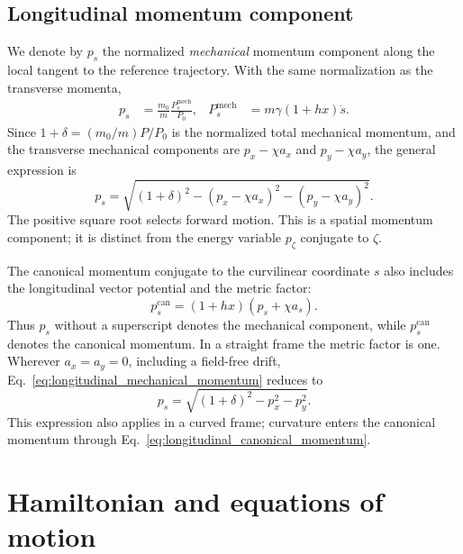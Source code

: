 \subsection{Longitudinal momentum component}
\label{sec:longitudinal_momentum}

We denote by $p_s$ the normalized \emph{mechanical} momentum component
along the local tangent to the reference trajectory. With the same
normalization as the transverse momenta,
\begin{align}
 p_s &= \frac{m_0}{m}\frac{P_s^{\mathrm{mech}}}{P_0}, &
 P_s^{\mathrm{mech}} &= m\gamma(1+hx)\dot s.
\end{align}
Since $1+\delta=(m_0/m)P/P_0$ is the normalized total mechanical
momentum, and the transverse mechanical components are $p_x-\chi a_x$
and $p_y-\chi a_y$, the general expression is
\begin{equation}
 p_s = \sqrt{(1+\delta)^2-(p_x-\chi a_x)^2-(p_y-\chi a_y)^2}.
 \label{eq:longitudinal_mechanical_momentum}
\end{equation}
The positive square root selects forward motion. This is a spatial
momentum component; it is distinct from the energy variable $p_\zeta$
conjugate to $\zeta$.

The canonical momentum conjugate to the curvilinear coordinate $s$
also includes the longitudinal vector potential and the metric factor:
\begin{equation}
 p_s^{\mathrm{can}}=(1+hx)(p_s+\chi a_s).
 \label{eq:longitudinal_canonical_momentum}
\end{equation}
Thus $p_s$ without a superscript denotes the mechanical component, while
$p_s^{\mathrm{can}}$ denotes the canonical momentum. In a straight frame
the metric factor is one. Wherever $a_x=a_y=0$, including a field-free
drift, Eq.~\eqref{eq:longitudinal_mechanical_momentum} reduces to
\begin{equation}
 p_s=\sqrt{(1+\delta)^2-p_x^2-p_y^2}.
 \label{eq:longitudinal_momentum_no_transverse_potential}
\end{equation}
This expression also applies in a curved frame; curvature enters the
canonical momentum through Eq.~\eqref{eq:longitudinal_canonical_momentum}.

\section{Hamiltonian and equations of motion}

